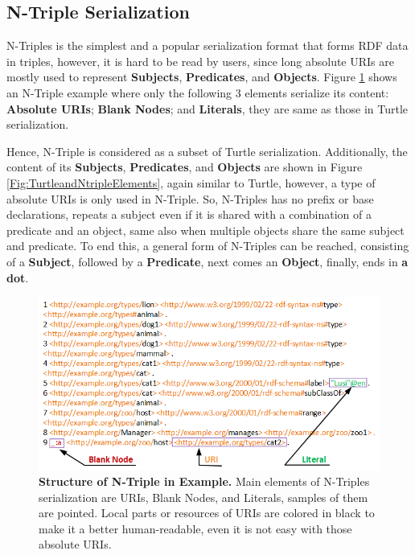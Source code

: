 \subsection{N-Triple Serialization}
N-Triples \cite{W3C:Ntriples:Online} is the simplest  and a popular serialization format that forms RDF data in triples, however, it is hard to be read by users, since long absolute URIs are mostly used to represent \textbf{Subjects}, \textbf{Predicates}, and \textbf{Objects}. Figure \ref{Fig:NTriplesStructure} shows an N-Triple example where  only the following 3 elements serialize its content:  \textbf{Absolute URIs}; \textbf{Blank Nodes}; and \textbf{Literals}, they are same as those in Turtle serialization. 

Hence, N-Triple is considered as a subset of Turtle serialization. Additionally, the content of its \textbf{Subjects}, \textbf{Predicates}, and \textbf{Objects} are shown in Figure \ref{Fig:TurtleandNtripleElements}, again similar to Turtle, however, a type of absolute URIs is only used in N-Triple. So, N-Triples has no prefix or base declarations, repeats a subject even if it is shared with a combination of a predicate and an object, same also when multiple objects share the same subject and predicate. To end this, a general form of N-Triples can be reached,  consisting of a \textbf{Subject}, followed by a \textbf{Predicate},  next comes an \textbf{Object}, finally, ends in  \textbf{a dot}.   

\begin{figure}[ht]
	\begin{center}
		\includegraphics[scale=0.8,angle=0]{images/NTriplesStructure.png}
		\setlength\belowcaptionskip{-5mm}
		\caption{\textbf{ Structure of N-Triple in Example.} Main elements of N-Triples serialization are URIs, Blank Nodes, and Literals, samples of them are pointed. Local parts or resources of URIs are colored in black to make it a better human-readable, even it is not easy with those absolute URIs.}
		\label{Fig:NTriplesStructure}
	\end{center}
\end{figure}


